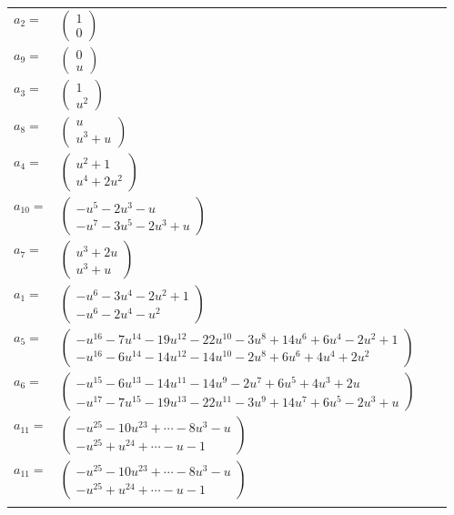 \documentclass[1p]{elsarticle_modified}
\theoremstyle{definition}
\begin{document}
\begin{tabular}{m{7pt} m{180pt} m{7pt} m{180pt} }
\flushright $a_{2}=$&$\begin{pmatrix}1\\0\end{pmatrix}$ \\
\flushright $a_{9}=$&$\begin{pmatrix}0\\u\end{pmatrix}$ \\
\flushright $a_{3}=$&$\begin{pmatrix}1\\u^2\end{pmatrix}$ \\
\flushright $a_{8}=$&$\begin{pmatrix}u\\u^3+u\end{pmatrix}$ \\
\flushright $a_{4}=$&$\begin{pmatrix}u^2+1\\u^4+2 u^2\end{pmatrix}$ \\
\flushright $a_{10}=$&$\begin{pmatrix}- u^5-2 u^3- u\\- u^7-3 u^5-2 u^3+u\end{pmatrix}$ \\
\flushright $a_{7}=$&$\begin{pmatrix}u^3+2 u\\u^3+u\end{pmatrix}$ \\
\flushright $a_{1}=$&$\begin{pmatrix}- u^6-3 u^4-2 u^2+1\\- u^6-2 u^4- u^2\end{pmatrix}$ \\
\flushright $a_{5}=$&$\begin{pmatrix}- u^{16}-7 u^{14}-19 u^{12}-22 u^{10}-3 u^8+14 u^6+6 u^4-2 u^2+1\\- u^{16}-6 u^{14}-14 u^{12}-14 u^{10}-2 u^8+6 u^6+4 u^4+2 u^2\end{pmatrix}$ \\
\flushright $a_{6}=$&$\begin{pmatrix}- u^{15}-6 u^{13}-14 u^{11}-14 u^9-2 u^7+6 u^5+4 u^3+2 u\\- u^{17}-7 u^{15}-19 u^{13}-22 u^{11}-3 u^9+14 u^7+6 u^5-2 u^3+u\end{pmatrix}$ \\
\flushright $a_{11}=$&$\begin{pmatrix}- u^{25}-10 u^{23}+\cdots-8 u^3- u\\- u^{25}+u^{24}+\cdots- u-1\end{pmatrix}$\\ \flushright $a_{11}=$&$\begin{pmatrix}- u^{25}-10 u^{23}+\cdots-8 u^3- u\\- u^{25}+u^{24}+\cdots- u-1\end{pmatrix}$\\&\end{tabular}
\end{document}
